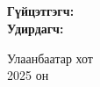 \begin{titlepage}
\begin{center}
\vspace{-40mm}
\textbf{\textsc{\normalsize \univname}}\\
\textbf{\textsc{\normalsize \deptname}}\\

\vspace{80mm}

\\
\textbf{\normalsize \ttitle}\\

\vspace{20mm}
\textbf{Гүйцэтгэгч: }\authorshort\\
\textbf{Удирдагч: }\supervisor\\

\end{center}

\vfill
\begin{center}
Улаанбаатар хот\\
2025 он\\
\end{center}

\end{titlepage}